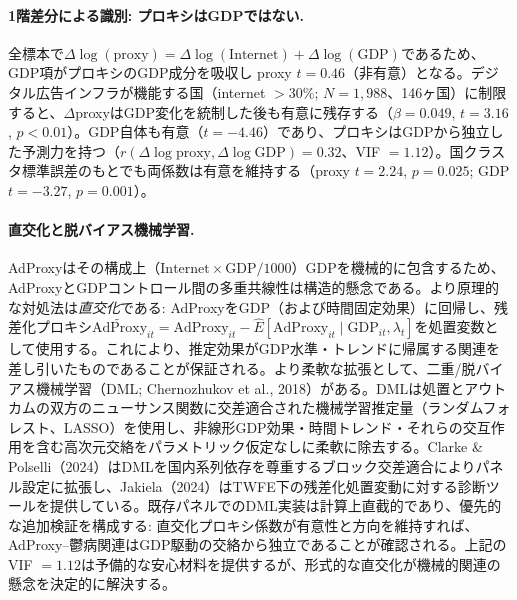 \documentclass[a4paper,11pt,titlepage]{article}
\begin{document}
\paragraph{1階差分による識別: プロキシはGDPではない.}\label{sec:first-diff}
全標本で$\Delta\log(\text{proxy}) = \Delta\log(\text{Internet}) + \Delta\log(\text{GDP})$であるため、GDP項がプロキシのGDP成分を吸収し proxy $t = 0.46$（非有意）となる。デジタル広告インフラが機能する国（internet $> 30\%$; $N = 1{,}988$、146ヶ国）に制限すると、$\Delta$proxyはGDP変化を統制した後も有意に残存する（$\beta = 0.049$, $t = 3.16$, $p < 0.01$）。GDP自体も有意（$t = -4.46$）であり、プロキシはGDPから独立した予測力を持つ（$r(\Delta\log\text{proxy}, \Delta\log\text{GDP}) = 0.32$、VIF $= 1.12$）。国クラスタ標準誤差のもとでも両係数は有意を維持する（proxy $t = 2.24$, $p = 0.025$; GDP $t = -3.27$, $p = 0.001$）。

\paragraph{直交化と脱バイアス機械学習.}
AdProxyはその構成上（$\text{Internet} \times \text{GDP}/1000$）GDPを機械的に包含するため、AdProxyとGDPコントロール間の多重共線性は構造的懸念である。より原理的な対処法は\textit{直交化}である: AdProxyをGDP（および時間固定効果）に回帰し、残差化プロキシ$\widetilde{\text{AdProxy}}_{it} = \text{AdProxy}_{it} - \hat{E}[\text{AdProxy}_{it} \mid \text{GDP}_{it}, \lambda_t]$を処置変数として使用する。これにより、推定効果がGDP水準・トレンドに帰属する関連を差し引いたものであることが保証される。より柔軟な拡張として、二重/脱バイアス機械学習（DML; Chernozhukov et al., 2018）がある。DMLは処置とアウトカムの双方のニューサンス関数に交差適合された機械学習推定量（ランダムフォレスト、LASSO）を使用し、非線形GDP効果・時間トレンド・それらの交互作用を含む高次元交絡をパラメトリック仮定なしに柔軟に除去する。Clarke \& Polselli（2024）はDMLを国内系列依存を尊重するブロック交差適合によりパネル設定に拡張し、Jakiela（2024）はTWFE下の残差化処置変動に対する診断ツールを提供している。既存パネルでのDML実装は計算上直截的であり、優先的な追加検証を構成する: 直交化プロキシ係数が有意性と方向を維持すれば、AdProxy--鬱病関連はGDP駆動の交絡から独立であることが確認される。上記のVIF $= 1.12$は予備的な安心材料を提供するが、形式的な直交化が機械的関連の懸念を決定的に解決する。
\end{document}
